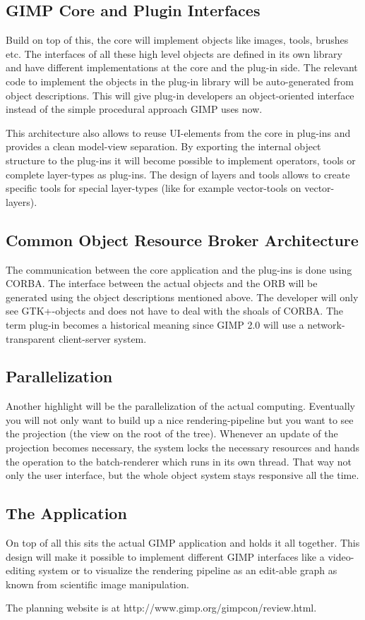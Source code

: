 \subsection{GIMP Core and Plugin Interfaces}

Build on top of this, the core will implement objects like images, tools,
brushes etc. The interfaces of all these high level objects are defined in its
own library and have different implementations at the core and the plug-in
side. The relevant code to implement the objects in the plug-in library will be
auto-generated from object descriptions. This will give plug-in developers an
object-oriented interface instead of the simple procedural approach GIMP uses
now.


This architecture also allows to reuse UI-elements from the core in plug-ins
and provides a clean model-view separation. By exporting the internal object
structure to the plug-ins it will become possible to implement operators, tools
or complete layer-types as plug-ins. The design of layers and tools allows to
create specific tools for special layer-types (like for example vector-tools on
vector-layers).

\subsection{Common Object Resource Broker Architecture}

The communication between the core application and the plug-ins is done using
CORBA. The interface between the actual objects and the ORB will be generated
using the object descriptions mentioned above. The developer will only see
GTK+-objects and does not have to deal with the shoals of CORBA. The term
plug-in becomes a historical meaning since GIMP 2.0 will use a
network-transparent client-server system.

\subsection{Parallelization}

Another highlight will be the parallelization of the actual computing.
Eventually you will not only want to build up a nice rendering-pipeline but you
want to see the projection (the view on the root of the tree). Whenever an
update of the projection becomes necessary, the system locks the necessary
resources and hands the operation to the batch-renderer which runs in its own
thread. That way not only the user interface, but the whole object system stays
responsive all the time.

\subsection{The Application}
On top of all this sits the actual GIMP application and holds it all together.
This design will make it possible to implement different GIMP interfaces like a
video-editing system or to visualize the rendering pipeline as an edit-able
graph as known from scientific image manipulation.

The planning website is at http://www.gimp.org/gimpcon/review.html.
 

